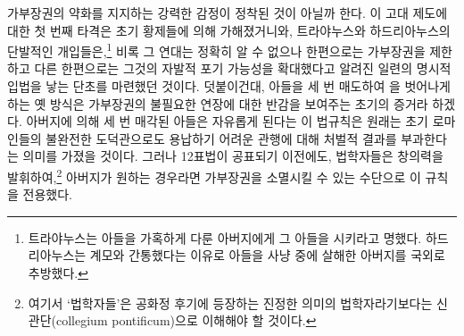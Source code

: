 가부장권의 약화를 지지하는 강력한 감정이 정착된 것이 아닐까 한다.
이 고대 제도에 대한 첫 번째 타격은 초기 황제들에 의해 가해졌거니와,
트라야누스와 하드리아누스의 단발적인 개입들은,\footnote{트라야누스는
아들을 가혹하게 다룬 아버지에게 그 아들을 시키라고 명했다.
하드리아누스는 계모와 간통했다는 이유로 아들을 사냥 중에 살해한 아버지를
국외로 추방했다.}
비록 그 연대는 정확히 알 수 없으나
한편으로는 가부장권을 제한하고
다른 한편으로는 그것의 자발적 포기 가능성을 확대했다고 알려진
일련의 명시적 입법을 낳는 단초를 마련했던 것이다.
덧붙이건대, 아들을 세 번 매도하여 을 벗어나게 하는 옛 방식은
가부장권의 불필요한 연장에 대한 반감을 보여주는
초기의 증거라 하겠다.
아버지에 의해 세 번 매각된 아들은 자유롭게 된다는 이 법규칙은
원래는
초기 로마인들의 불완전한 도덕관으로도
용납하기 어려운 관행에 대해 처벌적 결과를 부과한다는 의미를 가졌을 것이다.
그러나 12표법이 공표되기 이전에도,
법학자들은 창의력을 발휘하여,\footnote{여기서 `법학자들'은
공화정 후기에 등장하는 진정한 의미의 법학자라기보다는
신관단(collegium pontificum)으로 이해해야 할 것이다.}
아버지가 원하는 경우라면 가부장권을 소멸시킬 수 있는 수단으로
이 규칙을 전용했다.

